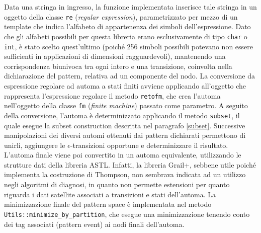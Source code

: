 Data una stringa in ingresso, la funzione implementata inserisce tale stringa in un oggetto della classe \verb|re| (\emph{regular expression}), parametrizzato per mezzo di un template che indica l'alfabeto di appartenenza dei simboli dell'espressione. 
Dato che gli alfabeti possibili per questa libreria erano esclusivamente di tipo \verb|char| o \verb|int|, è stato scelto quest'ultimo (poiché 256 simboli possibili potevano non essere sufficienti in applicazioni di dimensioni ragguardevoli), mantenendo una corrispondenza biunivoca tra ogni intero e una transizione, coinvolta nella dichiarazione del pattern, relativa ad un componente del nodo. La conversione da espressione regolare ad automa a stati finiti avviene applicando all'oggetto che rappresenta l'espressione regolare il metodo \verb|retofm|, che crea l'automa nell'oggetto della classe \verb|fm| (\emph{finite machine}) passato come parametro. A seguito della conversione, l'automa è determinizzato applicando il metodo \verb|subset|, il quale esegue la subset construction descritta nel paragrafo \ref{subset}.
Successive manipolazioni dei diversi automi ottenuti dai pattern dichiarati permettono di unirli, aggiungere le $\epsilon$-transizioni opportune e determinizzare il risultato. L'automa finale viene poi convertito in un automa equivalente, utilizzando le strutture dati della libreria ASTL. Infatti, la libreria Grail+, sebbene utile poiché implementa la costruzione di Thompson, non sembrava indicata ad un utilizzo negli algoritmi di diagnosi, in quanto non permette estensioni per quanto riguarda i dati satellite associati a transizioni e stati dell'automa.
La minimizzazione finale del pattern space è implementata nel metodo \verb|Utils::minimize_by_partition|, che esegue una minimizzazione tenendo conto dei tag associati (pattern event) ai nodi finali dell'automa.


